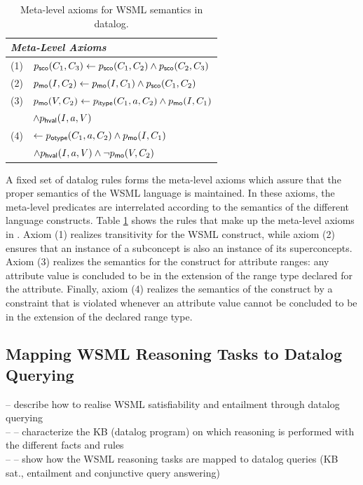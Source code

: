\begin{table}[tb]\label{tab:meta-level}\centering
\begin{small}
\begin{tabular}{|ll|}
  \hline
  \multicolumn{2}{|l|}{\rule{0cm}{3.2mm}{\normalsize \emph{Meta-Level Axioms}}} \\
  \hline
  (1) & $p_{\mathrm{\sf sco}}(C_1,C_3) \leftarrow p_{\mathrm{\sf sco}}(C_1,C_2) \wedge p_{\mathrm{\sf sco}}(C_2,C_3)$ \\
  (2) & $p_{\mathrm{\sf mo}}(I,C_2) \leftarrow p_{\mathrm{\sf mo}}(I,C_1) \wedge p_{\mathrm{\sf sco}}(C_1,C_2)$ \\
  (3) & $p_{\mathrm{\sf mo}}(V,C_2) \leftarrow p_{\mathrm{\sf itype}}(C_1,a,C_2) \wedge p_{\mathrm{\sf mo}}(I,C_1)$ \\
  & \phantom{$\pmo(V,C_2) \leftarrow$} $\wedge p_{\mathrm{\sf hval}}(I,a,V)$ \\
  (4) & $\leftarrow p_{\mathrm{\sf otype}}(C_1,a,C_2) \wedge p_{\mathrm{\sf mo}}(I,C_1)$ \\
  & \phantom{$\leftarrow$} $\wedge p_{\mathrm{\sf hval}}(I,a,V) \wedge \neg p_{\mathrm{\sf mo}}(V,C_2)$ \\
 \hline
\end{tabular}
\end{small} \caption{Meta-level axioms for WSML semantics in
datalog.}
\end{table}

A fixed set \mlaxioms of datalog rules forms the meta-level axioms
which assure that the proper semantics of the WSML language is
maintained. In these axioms, the meta-level predicates are
interrelated according to the semantics of the different language
constructs. Table \ref{tab:meta-level} shows the rules that make
up the meta-level axioms in \mlaxioms. Axiom (1) realizes
transitivity for the WSML  construct, while
axiom (2) ensures that an instance of a subconcept is also an
instance of its superconcepts. Axiom (3) realizes the semantics
for the  construct for attribute ranges: any
attribute value is concluded to be in the extension of the range
type declared for the attribute. Finally, axiom (4) realizes the
semantics of the  construct by a constraint that is
violated whenever an attribute value cannot be concluded to be in
the extension of the declared range type.

\subsection{Mapping WSML Reasoning Tasks to Datalog Querying}
-- describe how to realise WSML satisfiability and entailment through datalog querying \\
-- -- characterize the KB (datalog program) on which reasoning is performed with the different facts and rules  \\
-- -- show how the WSML reasoning tasks are mapped to datalog queries (KB sat., entailment and conjunctive query answering) \\

